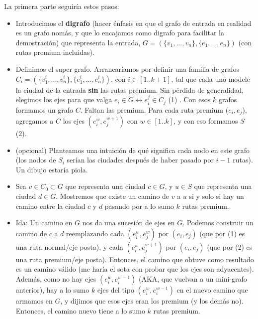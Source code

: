 La primera parte seguiría estos pasos:
\begin{itemize}
	\item Introducimos el \textbf{digrafo} (hacer énfasis en que el grafo de entrada en realidad es un grafo nomás, y que lo encajamos como digrafo para facilitar la demostración) que representa la entrada, $G = (\{v_1, ..., v_n\}, \{e_1, ..., e_n\})$ (con rutas premium incluidas).
	
	\item Definimos el super grafo. Arrancaríamos por definir una familia de grafos ${C_i = (\{v^i_1, ..., v^i_n\}, \{e^i_1, ..., e^i_n\})}$, con $i \in [1..k+1]$, tal que cada uno modele la ciudad de la entrada \textbf{sin} las rutas premium. Sin pérdida de generalidad, elegimos los ejes para que valga $e_i \in G \leftrightarrow e^j_i \in C_j$ (1) . Con esos $k$ grafos formamos un grafo $C$. Faltan las premium. Para cada ruta premium ($e_i, e_j$), agregamos a $C$ los ejes $(e^w_i,e^{w+1}_j)$ con $w \in [1..k]$, y con eso formamos $S$ (2).
	
	\item (opcional) Planteamos una intuición de qué significa cada nodo en este grafo (los nodos de $S_i$ serían las ciudades después de haber pasado por $i-1$ rutas). Un dibujo estaría piola.
	
	\item Sea $v \in C_0 \subset G$ que representa una ciudad $c \in G$, y $u \in S$ que representa una ciudad $d \in G$. Mostremos que existe un camino de $v$ a $u$ si y solo si hay un camino entre la ciudad $c$ y $d$ pasando por a lo sumo $k$ rutas premium.
	
	\item Ida: Un camino en $G$ nos da una sucesión de ejes en $G$. Podemos construir un camino de $c$ a $d$ reemplazando cada $(e^w_i,e^w_j)$ por $(e_i,e_j)$ (que por (1) es una ruta normal/eje posta), y cada $(e^w_i,e^{w+1}_j)$ por $(e_i,e_j)$ (que por (2) es una ruta premium/eje posta). Entonces, el camino que obtuve como resultado es un camino válido (me haría el sota con probar que los ejes son adyacentes). Además, como no hay ejes $(e^w_i, e^{w-1}_i)$ (AKA, que vuelvan a un mini-grafo anterior), hay a lo sumo $k$ ejes del tipo $(e^w_i, e^{w-1}_i)$ en el nuevo camino que armamos en $G$, y dijimos que esos ejes eran los premium (y los demás no). Entonces, el camino nuevo tiene a lo sumo $k$ rutas premium.
	

\end{itemize}
